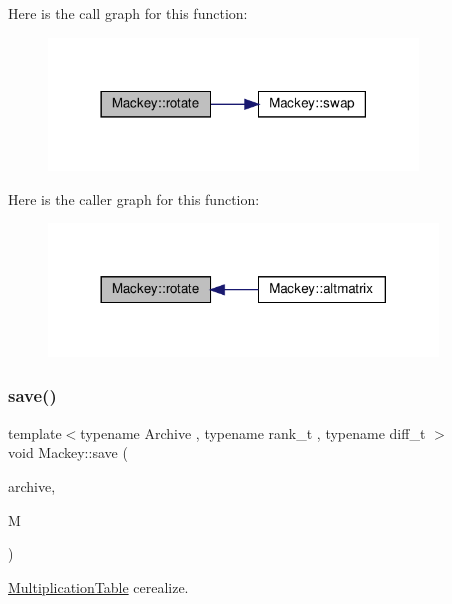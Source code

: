 Here is the call graph for this function\+:\nopagebreak
\begin{figure}[H]
\begin{center}
\leavevmode
\includegraphics[width=278pt]{namespaceMackey_a38a833de54971845cbdb8c96f830725b_cgraph}
\end{center}
\end{figure}
Here is the caller graph for this function\+:\nopagebreak
\begin{figure}[H]
\begin{center}
\leavevmode
\includegraphics[width=293pt]{namespaceMackey_a38a833de54971845cbdb8c96f830725b_icgraph}
\end{center}
\end{figure}
\mbox{\label{namespaceMackey_aa0c6d96a072ff58e3ef99b4461ae219f}} 
\subsubsection{\texorpdfstring{save()}{save()}}
{\footnotesize\ttfamily template$<$typename Archive , typename rank\+\_\+t , typename diff\+\_\+t $>$ \\
void Mackey\+::save (\begin{DoxyParamCaption}\item[{Archive \&}]{archive,  }\item[{const \hyperlink{classMackey_1_1MultiplicationTable}{Multiplication\+Table}$<$ rank\+\_\+t, diff\+\_\+t $>$ \&}]{M }\end{DoxyParamCaption})}



\hyperlink{classMackey_1_1MultiplicationTable}{Multiplication\+Table} cerealize. 

